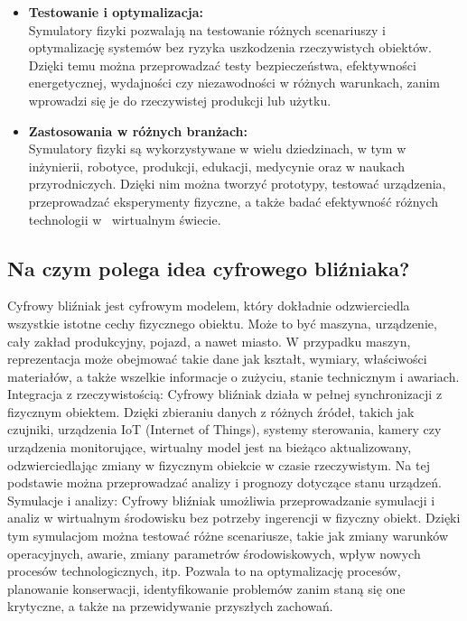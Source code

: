 \documentclass[12pt]{article}
\begin{document}
\begin{itemize}
  \item \textbf{Testowanie i optymalizacja:}\\
  Symulatory fizyki pozwalają na testowanie różnych scenariuszy i optymalizację systemów bez ryzyka uszkodzenia rzeczywistych obiektów. Dzięki temu można przeprowadzać testy bezpieczeństwa, efektywności energetycznej, wydajności czy niezawodności w różnych warunkach, zanim wprowadzi się je do rzeczywistej produkcji lub użytku.

  \item \textbf{Zastosowania w różnych branżach:}\\
  Symulatory fizyki są wykorzystywane w wielu dziedzinach, w tym w inżynierii, robotyce, produkcji, edukacji, medycynie oraz w naukach przyrodniczych. Dzięki nim można tworzyć prototypy, testować urządzenia, przeprowadzać eksperymenty fizyczne, a także badać efektywność różnych technologii w~ wirtualnym świecie.
\end{itemize}

\subsection{Na czym polega idea cyfrowego bliźniaka?}
Cyfrowy bliźniak jest cyfrowym modelem, który dokładnie odzwierciedla wszystkie istotne cechy fizycznego obiektu. Może to być maszyna, urządzenie, cały zakład produkcyjny, pojazd, a nawet miasto. W przypadku maszyn, reprezentacja może obejmować takie dane jak kształt, wymiary, właściwości materiałów, a także wszelkie informacje o zużyciu, stanie technicznym i awariach.\\

\noindent Integracja z rzeczywistością: Cyfrowy bliźniak działa w pełnej synchronizacji z fizycznym obiektem. Dzięki zbieraniu danych z różnych źródeł, takich jak czujniki, urządzenia IoT (Internet of Things), systemy sterowania, kamery czy urządzenia monitorujące, wirtualny model jest na bieżąco aktualizowany, odzwierciedlając zmiany w fizycznym obiekcie w czasie rzeczywistym. Na tej podstawie można przeprowadzać analizy i prognozy dotyczące stanu urządzeń.\\

\noindent Symulacje i analizy: Cyfrowy bliźniak umożliwia przeprowadzanie symulacji i analiz w wirtualnym środowisku bez potrzeby ingerencji w fizyczny obiekt. Dzięki tym symulacjom można testować różne scenariusze, takie jak zmiany warunków operacyjnych, awarie, zmiany parametrów środowiskowych, wpływ nowych procesów technologicznych, itp. Pozwala to na optymalizację procesów, planowanie konserwacji, identyfikowanie problemów zanim staną się one krytyczne, a także na przewidywanie przyszłych zachowań.\\
\end{document}
